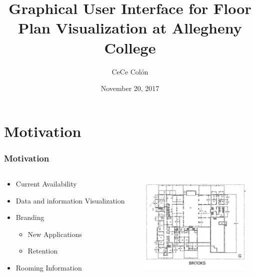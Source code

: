 \documentclass[hyperref={pdfpagelabels=false}]{beamer}
\title{Graphical User Interface for Floor Plan Visualization at Allegheny College}
\author{CeCe Col\'{o}n}
\date{November 20, 2017}
\begin{document}
\begin{frame}
\titlepage
\end{frame} 


\section{Motivation}
\hypertarget{Motivation}{{}}
\begin{frame}
\frametitle{Motivation}

\begin{columns}
	 \begin{column}{.45\textwidth}
\begin{itemize}[<+->]
\item Current Availability 
\item Data and information Visualization
\item Branding
\begin{itemize}
	\item New Applications
	\item Retention
\end{itemize} 
\item Rooming Information
\end{itemize} 
	\end{column}
 \begin{column}{.6\textwidth}
 	 \centering
             \includegraphics[height=5cm, width=5.5cm]{brooksG.png} 
 \end{column}

\end{columns}
\end{frame}
\end{document}
